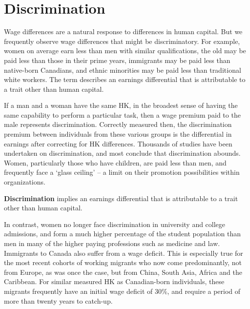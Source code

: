 \section{Discrimination}\label{sec:ch13sec6}

Wage differences are a natural response to differences in human capital. But we frequently observe wage differences that might be discriminatory. For example, women on average earn less than men with similar qualifications, the old may be paid less than those in their prime years, immigrants may be paid less than native-born Canadians, and ethnic minorities may be paid less than traditional white workers. The term  describes an earnings differential that is attributable to a trait other than human capital.

If a man and a woman have the same HK, in the broadest sense of having the same capability to perform a particular task, then a wage premium paid to the male represents discrimination. Correctly measured then, the discrimination premium between individuals from these various groups is the differential in earnings after correcting for HK differences. Thousands of studies have been undertaken on discrimination, and most conclude that discrimination abounds. Women, particularly those who have children, are paid less than men, and frequently face a `glass ceiling' -- a limit on their promotion possibilities within organizations.

\begin{DefBox}
\textbf{Discrimination} implies an earnings differential that is attributable to a trait other than human capital.
\end{DefBox}

In contrast, women no longer face discrimination in university and college admissions, and form a much higher percentage of the student population than men in many of the higher paying professions such as medicine and law. Immigrants to Canada also suffer from a wage deficit. This is especially true for the most recent cohorts of working migrants who now come predominantly, not from Europe, as was once the case, but from China, South Asia, Africa and the Caribbean. For similar measured HK as Canadian-born individuals, these migrants frequently have an initial wage deficit of 30\%, and require a period of more than twenty years to catch-up.